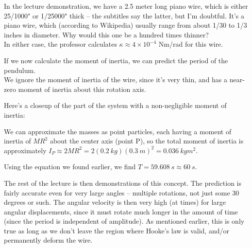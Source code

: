 In the lecture demonstration, we have a 2.5 meter long piano wire, which is either 25/1000" or 1/25000" thick -- the subtitles say the latter, but I'm doubtful. It's a piano wire, which (according to Wikipedia) usually range from about 1/30 to 1/3 inches in diameter. Why would this one be a hundred times thinner?\\
In either case, the professor calculates $\kappa \approx 4 \times 10^{-4}$ Nm/rad for this wire.

If we now calculate the moment of inertia, we can predict the period of the pendulum.\\
We ignore the moment of inertia of the wire, since it's very thin, and has a near-zero moment of inertia about this rotation axis.

Here's a closeup of the part of the system with a non-negligible moment of inertia:

\begin{figure}[H]
\centering
{}
\end{figure}

We can approximate the masses as point particles, each having a moment of inertia of $M R^2$ about the center axis (point P), so the total moment of inertia is approximately $I_P \approx 2 M R^2 = 2(\SI{0.2}{kg})(\SI{0.3}{m})^2 = \SI{0.036}{kg m^2}$.

Using the equation we found earlier, we find $T = \SI{59.608}{s} \approx \SI{60}{s}$.

The rest of the lecture is then demonstrations of this concept. The prediction is fairly accurate even for very large angles -- multiple rotations, not just some 30 degrees or such. The angular velocity is then very high (at times) for large angular displacements, since it must rotate much longer in the amount of time (since the period is independent of amplitude). As mentioned earlier, this is only true as long as we don't leave the region where Hooke's law is valid, and/or permanently deform the wire.

